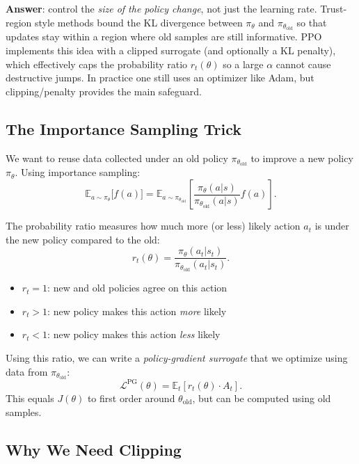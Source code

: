 \textbf{Answer}: control the \emph{size of the policy change}, not just the learning rate. Trust-region style methods bound the KL divergence between $\pi_\theta$ and $\pi_{\theta_{\text{old}}}$ so that updates stay within a region where old samples are still informative. PPO implements this idea with a clipped surrogate (and optionally a KL penalty), which effectively caps the probability ratio $r_t(\theta)$ so a large $\alpha$ cannot cause destructive jumps. In practice one still uses an optimizer like Adam, but clipping/penalty provides the main safeguard.

\subsection{The Importance Sampling Trick}

We want to reuse data collected under an old policy $\pi_{\theta_{\text{old}}}$ to improve a new policy $\pi_\theta$. Using importance sampling:
\[
    \mathbb{E}_{a \sim \pi_\theta}\bigl[f(a)\bigr] = \mathbb{E}_{a \sim \pi_{\theta_{\text{old}}}}\left[ \frac{\pi_\theta(a|s)}{\pi_{\theta_{\text{old}}}(a|s)} f(a) \right].
\]

\begin{definition}
    The probability ratio measures how much more (or less) likely action $a_t$ is under the new policy compared to the old:
    \[
        r_t(\theta) = \frac{\pi_\theta(a_t|s_t)}{\pi_{\theta_{\text{old}}}(a_t|s_t)}.
    \]
    \begin{itemize}
        \item $r_t = 1$: new and old policies agree on this action
        \item $r_t > 1$: new policy makes this action \emph{more} likely
        \item $r_t < 1$: new policy makes this action \emph{less} likely
    \end{itemize}
\end{definition}

Using this ratio, we can write a \emph{policy-gradient surrogate} that we optimize using data from $\pi_{\theta_{\text{old}}}$:
\[
    \mathcal{L}^{\text{PG}}(\theta) = \mathbb{E}_t \left[ r_t(\theta) \cdot A_t \right].
\]
This equals $J(\theta)$ to first order around $\theta_{\text{old}}$, but can be computed using old samples.

\subsection{Why We Need Clipping}

